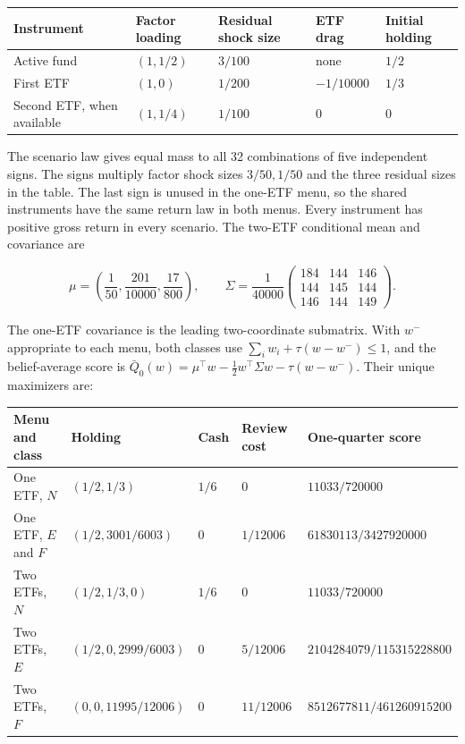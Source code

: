 \documentclass[11pt]{article}
\begin{document}
{\footnotesize\setlength{\tabcolsep}{4pt}
\begin{longtable}{lllll}
\toprule
\textbf{Instrument} & \textbf{Factor loading} & \textbf{Residual shock size} & \textbf{ETF drag} & \textbf{Initial holding} \\
\midrule
\endhead
\bottomrule
\endlastfoot
Active fund & \((1,1/2)\) & \(3/100\) & none & \(1/2\) \\
First ETF & \((1,0)\) & \(1/200\) & \(-1/10000\) & \(1/3\) \\
Second ETF, when available & \((1,1/4)\) & \(1/100\) & \(0\) & \(0\) \\
\end{longtable}}

The scenario law gives equal mass to all 32 combinations of five independent
signs. The signs multiply factor shock sizes \(3/50,1/50\) and the three
residual sizes in the table. The last sign is unused in the one-ETF menu,
so the shared instruments have the same return law in both menus. Every
instrument has positive gross return in every scenario. The two-ETF
conditional mean and covariance are

\begin{equation*}
\mu=\left(\frac1{50},\frac{201}{10000},\frac{17}{800}\right),
\qquad
\Sigma=\frac1{40000}
\begin{pmatrix}184&144&146\\144&145&144\\146&144&149\end{pmatrix}.
                                                               \tag{16}\label{eq:16}
\end{equation*}

The one-ETF covariance is the leading two-coordinate submatrix. With
\(w^-\) appropriate to each menu, both classes use
\(\sum_i w_i+\tau(w-w^-)\leq1\), and the belief-average score is
\(\bar Q_0(w)=\mu^\top w-\tfrac12w^\top\Sigma w-\tau(w-w^-)\).
Their unique maximizers are:

{\setlength{\tabcolsep}{4pt}
\begin{longtable}{lllll}
\toprule
\textbf{Menu and class} & \textbf{Holding} & \textbf{Cash} & \textbf{Review cost} & \textbf{One-quarter score} \\
\midrule
\endhead
\bottomrule
\endlastfoot
One ETF, \(N\) & \((1/2,1/3)\) & \(1/6\) & \(0\) & \(11033/720000\) \\
One ETF, \(E\) and \(F\) & \((1/2,3001/6003)\) & \(0\) & \(1/12006\) & \(61830113/3427920000\) \\
Two ETFs, \(N\) & \((1/2,1/3,0)\) & \(1/6\) & \(0\) & \(11033/720000\) \\
Two ETFs, \(E\) & \((1/2,0,2999/6003)\) & \(0\) & \(5/12006\) & \(2104284079/115315228800\) \\
Two ETFs, \(F\) & \((0,0,11995/12006)\) & \(0\) & \(11/12006\) & \(8512677811/461260915200\) \\
\end{longtable}}
\end{document}
